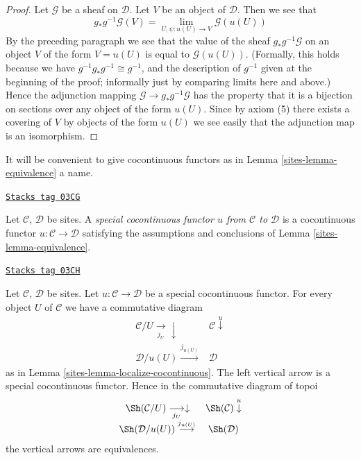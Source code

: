 \begin{proof}
\medskip\noindent
Let $\mathcal{G}$ be a sheaf on $\mathcal{D}$. Let $V$ be an
object of $\mathcal{D}$. Then we see that
$$
g_*g^{-1}\mathcal{G}(V) =
\lim_{U, \psi : u(U) \to V} \mathcal{G}(u(U))
$$
By the preceding paragraph we see that the value of the sheaf
$g_*g^{-1}\mathcal{G}$ on an object $V$ of the form $V = u(U)$
is equal to $\mathcal{G}(u(U))$. (Formally, this holds because
we have $g^{-1}g_*g^{-1} \cong g^{-1}$, and the description
of $g^{-1}$ given at the beginning of the proof; informally just by
comparing limits here and above.)
Hence the adjunction mapping $\mathcal{G} \to g_*g^{-1}\mathcal{G}$ has
the property that it is a bijection on sections over any object of the
form $u(U)$. Since by axiom (5) there
exists a covering of $V$ by objects of the form $u(U)$ we see
easily that the adjunction map is an isomorphism.
\end{proof}

It will be convenient to give cocontinuous functors as in
Lemma \ref{sites-lemma-equivalence} a name.

\begin{definition}
\label{sites-definition-special-cocontinuous-functor}
\href{https://stacks.math.columbia.edu/tag/03CG}{\texttt{Stacks tag 03CG}}

Let $\mathcal{C}$, $\mathcal{D}$ be sites.
A {\it special cocontinuous functor $u$ from $\mathcal{C}$ to $\mathcal{D}$}
is a cocontinuous functor $u : \mathcal{C} \to \mathcal{D}$ satisfying
the assumptions and conclusions of Lemma \ref{sites-lemma-equivalence}.
\end{definition}

\begin{lemma}
\label{sites-lemma-localize-special-cocontinuous}
\href{https://stacks.math.columbia.edu/tag/03CH}{\texttt{Stacks tag 03CH}}

Let $\mathcal{C}$, $\mathcal{D}$ be sites.
Let $u : \mathcal{C} \to \mathcal{D}$ be a special cocontinuous functor.
For every object $U$ of $\mathcal{C}$ we have a commutative diagram
$$
\begin{array}{cc}\mathcal{C}/U \underset{j_U}{\longrightarrow}\downarrow & \mathcal{C} \overset{u}{\downarrow} \\ \mathcal{D}/u(U) \overset{j_{u(U)}}{\longrightarrow} & \mathcal{D}\end{array}
$$
as in Lemma \ref{sites-lemma-localize-cocontinuous}.
The left vertical arrow is a special cocontinuous functor.
Hence in the commutative diagram of topoi
$$
\begin{array}{cc}\Sh(\mathcal{C}/U) \underset{j_U}{\longrightarrow}\downarrow & \Sh(\mathcal{C}) \overset{u}{\downarrow} \\ \Sh(\mathcal{D}/u(U)) \overset{j_{u(U)}}{\longrightarrow} & \Sh(\mathcal{D})\end{array}
$$
the vertical arrows are equivalences.
\end{lemma}

